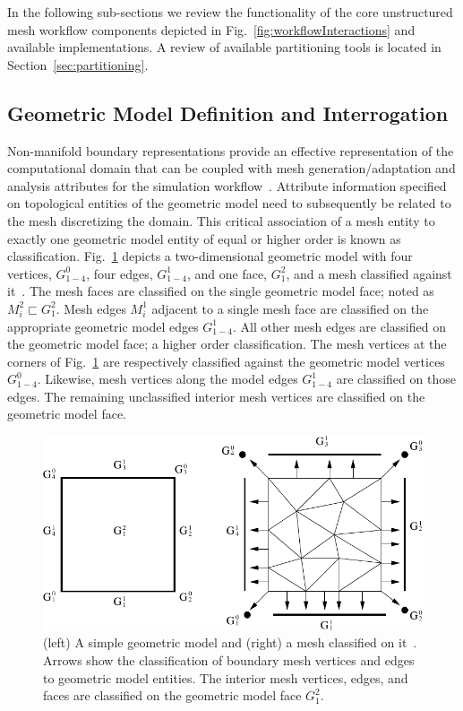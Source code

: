 In the following sub-sections we review the functionality of the core
unstructured mesh workflow components depicted in
Fig.~\ref{fig:workflowInteractions} and available implementations.
A review of available partitioning tools is located in
Section~\ref{sec:partitioning}.

\subsection{Geometric Model Definition and Interrogation}

Non-manifold boundary representations provide an effective representation of the
computational domain that can be coupled with mesh generation/adaptation and
analysis attributes for the simulation workflow~\cite{BeaWal}.
Attribute information specified on topological entities of the geometric model
need to subsequently be related to the mesh discretizing the domain.
This critical association of a mesh entity to exactly one geometric model entity
of equal or higher order is known as classification.
Fig.~\ref{fig:geomclassification} depicts a two-dimensional geometric model
with four vertices, $G^0_{1-4}$, four edges, $G^1_{1-4}$, and one face, $G^2_1$,
and a mesh classified against it~\cite{ibanez2016pumi}.
The mesh faces are classified on the single geometric model face;
noted as $M^2_i \sqsubset G^2_1$.
Mesh edges $M^1_i$ adjacent to a single mesh face are classified on the
appropriate geometric model edges $G^1_{1-4}$.
All other mesh edges are classified on the geometric model face; a higher order
classification.
The mesh vertices at the corners of Fig.~\ref{fig:geomclassification} are
respectively classified against the geometric model vertices $G^0_{1-4}$.
Likewise, mesh vertices along the model edges $G^1_{1-4}$ are classified on
those edges.
The remaining unclassified interior mesh vertices are classified on the
geometric model face.

\begin{figure} \centering
  \includegraphics[width=.7\textwidth]{figures/gclas.pdf}
  \caption[A simple geometric model and a mesh classified on it.]{
    (left) A simple geometric model and (right) a mesh classified on
    it~\cite{ibanez2016pumi}.
    Arrows show the classification of boundary mesh vertices and edges to geometric model
    entities.
    The interior mesh vertices, edges, and faces are classified on the geometric
    model face $G^2_1$.}
  \label{fig:geomclassification}
\end{figure}

